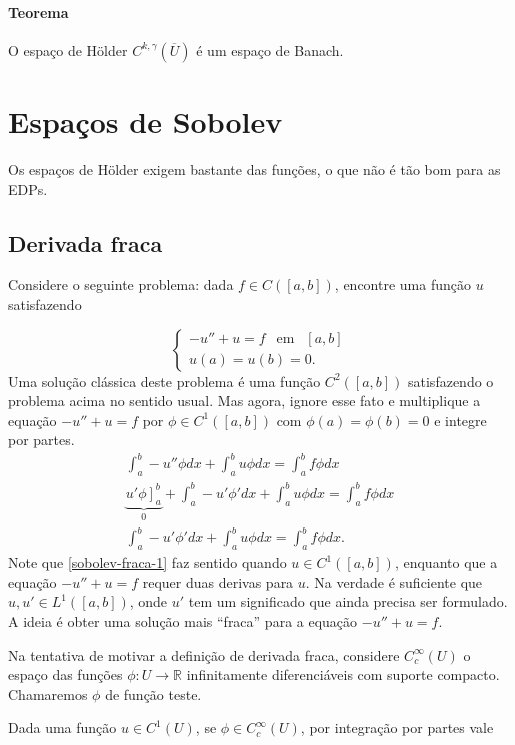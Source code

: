 \documentclass[a4paper, 11pt]{article}
\newcommand{\holder}[2][k,\gamma]{{C^{#1}(\overline{#2})}}
\begin{document}
\paragraph{Teorema} O espaço de Hölder \( \holder{U} \) é um espaço de Banach.


\section{Espaços de Sobolev}

Os espaços de Hölder exigem bastante das funções, o que não é tão bom para as EDPs.

\subsection*{Derivada fraca}

Considere o seguinte problema: dada $f \in C([a,b])$, encontre uma função $u$ satisfazendo

\[ \begin{cases}
-u'' +u =f \ \ \mbox{ em } \ \ [a,b] \\
	u(a)=u(b)=0.
\end{cases} \]
Uma solução clássica deste problema é uma função $C^2([a,b])$ satisfazendo o problema acima no sentido usual. Mas agora, ignore esse fato e multiplique a equação $-u'' +u =f $ por $\phi \in C^1([a,b])$ com $\phi(a)=\phi(b)=0$ e integre por partes.
\begin{align}\label{sobolev-fraca-1}
\int_a^b -u'' \phi dx +  \int_a^b u \phi dx =  \int_a^b f \phi dx\nonumber \\
\underbrace{\left. u' \phi \right]_a^b}_{0} + \int_a^b -u' \phi' dx +  \int_a^b u \phi dx =  \int_a^b f \phi dx \nonumber\\
\int_a^b -u' \phi' dx +  \int_a^b u \phi dx =  \int_a^b f \phi dx .
\end{align}
Note que \eqref{sobolev-fraca-1} faz sentido quando $u \in C^1([a,b])$, enquanto que a equação  $-u'' +u =f $ requer duas derivas para $u$. Na verdade é suficiente que $u, u' \in L^1([a,b])$, onde $u'$ tem um significado que ainda precisa ser formulado. A ideia é obter uma solução mais ``fraca'' para a equação $-u'' +u =f $.

Na tentativa de motivar a definição de derivada fraca, considere $C^{\infty}_c (U)$ o espaço das funções $ \phi :U \longrightarrow \mathbb{R}$ infinitamente diferenciáveis com suporte compacto. Chamaremos $\phi$ de função teste.

Dada uma função $u \in C^1(U)$, se $\phi \in C^{\infty}_c (U)$, por integração por partes vale
\end{document}
